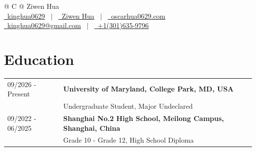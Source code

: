 \documentclass[a4paper,12pt]{article}
\begin{document}
\pagestyle{empty}



\begin{tabularx}{\linewidth}{@{} C @{}}
    \Huge{Ziwen Hua}                                                                    \\[7.5pt]
    \href{https://github.com/kinghua0629}{\raisebox{-0.05\height}\faGithub\ kinghua0629} \ $|$ \
    \href{https://linkedin.com/in/ziwen-hua-625a6a3b4}{\raisebox{-0.05\height}\faLinkedin\ Ziwen Hua} \ $|$ \
    \href{https://oscarhua0629.com}{\raisebox{-0.05\height}\faGlobe \ oscarhua0629.com} \\
    \href{mailto:kinghua0629@gmail.com}{\raisebox{-0.05\height}\faEnvelope \ kinghua0629@gmail.com} \ $|$ \
    \href{tel:+1(301)635-9796}{\raisebox{-0.05\height}\faMobile \ +1(301)635-9796}      \\
\end{tabularx}

\section{Education}
\begin{tabularx}{\linewidth}{@{}l X@{}}
    09/2026 - Present & \textbf{University of Maryland, College Park, MD, USA}              \\ & Undergraduate Student, Major Undeclared \\
    09/2022 - 06/2025 & \textbf{Shanghai No.2 High School, Meilong Campus, Shanghai, China} \\ & Grade 10 - Grade 12, High School Diploma \\
\end{tabularx}
\end{document}
